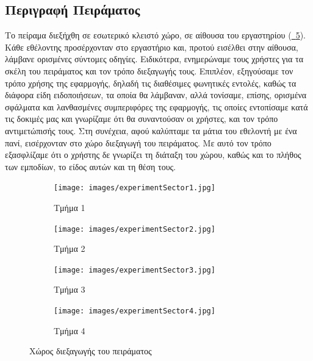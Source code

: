 \subsection{Περιγραφή Πειράματος}

Το πείραμα διεξήχθη σε εσωτερικό κλειστό χώρο, σε αίθουσα του εργαστηρίου (\hyperref[fig:experimentLab]{\schema~\ref*{fig:experimentLab}}). Κάθε εθέλοντης προσέρχονταν στο εργαστήριο και, προτού εισέλθει στην αίθουσα, λάμβανε ορισμένες σύντομες οδηγίες. Ειδικότερα, ενημερώναμε τους χρήστες για τα σκέλη του πειράματος και τον τρόπο διεξαγωγής τους. Επιπλέον, εξηγούσαμε τον τρόπο χρήσης της εφαρμογής, δηλαδή τις διαθέσιμες φωνητικές εντολές, καθώς τα διάφορα είδη ειδοποιήσεων, τα οποία θα λάμβαναν, αλλά τονίσαμε, επίσης, ορισμένα σφάλματα και λανθασμένες συμπεριφόρες της εφαρμογής, τις οποίες εντοπίσαμε κατά τις δοκιμές μας και γνωρίζαμε ότι θα συναντούσαν οι χρήστες, και τον τρόπο αντιμετώπισής τους. Στη συνέχεια, αφού καλύπταμε τα μάτια του εθελοντή με ένα πανί, εισέρχονταν στο χώρο διεξαγωγή του πειράματος. Με αυτό τον τρόπο εξασφλίζαμε ότι ο χρήστης δε γνωρίζει τη διάταξη του χώρου, καθώς και το πλήθος των εμποδίων, το είδος αυτών και τη θέση τους.

\begin{figure}[!h]
  \centering
  \begin{subfigure}{0.25\textwidth}
    \centering
    \texttt{[image: images/experimentSector1.jpg]}
    \caption{Τμήμα 1}\label{fig:experimentSector1}
  \end{subfigure}%
  \begin{subfigure}{0.25\textwidth}
    \centering
    \texttt{[image: images/experimentSector2.jpg]}
    \caption{Τμήμα 2}\label{fig:experimentSector2}
  \end{subfigure}%
  \begin{subfigure}{0.25\textwidth}
    \centering
    \texttt{[image: images/experimentSector3.jpg]}
    \caption{Τμήμα 3}\label{fig:experimentSector3}
  \end{subfigure}%
  \begin{subfigure}{0.25\textwidth}
    \centering
    \texttt{[image: images/experimentSector4.jpg]}
    \caption{Τμήμα 4}\label{fig:experimentSector4}
  \end{subfigure}%
  \caption{Χώρος διεξαγωγής του πειράματος}\label{fig:experimentLab}
\end{figure}

